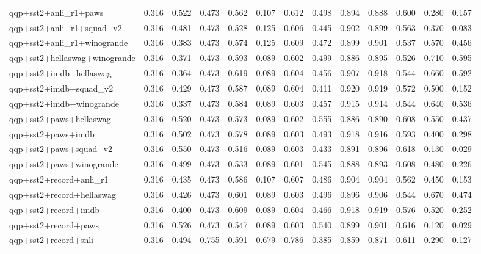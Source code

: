 \begin{table}[t]
\begin{tabular}{lrrrrrrrrrrrr}
    qqp+sst2+anli\_r1+paws & 0.316 & 0.522 & 0.473 & 0.562 & 0.107 & 0.612 & 0.498 & 0.894 & 0.888 & 0.600 & 0.280 & 0.157 \\
    qqp+sst2+anli\_r1+squad\_v2 & 0.316 & 0.481 & 0.473 & 0.528 & 0.125 & 0.606 & 0.445 & 0.902 & 0.899 & 0.563 & 0.370 & 0.083 \\
    qqp+sst2+anli\_r1+winogrande & 0.316 & 0.383 & 0.473 & 0.574 & 0.125 & 0.609 & 0.472 & 0.899 & 0.901 & 0.537 & 0.570 & 0.456 \\
    qqp+sst2+hellaswag+winogrande & 0.316 & 0.371 & 0.473 & 0.593 & 0.089 & 0.602 & 0.499 & 0.886 & 0.895 & 0.526 & 0.710 & 0.595 \\
    qqp+sst2+imdb+hellaswag & 0.316 & 0.364 & 0.473 & 0.619 & 0.089 & 0.604 & 0.456 & 0.907 & 0.918 & 0.544 & 0.660 & 0.592 \\
    qqp+sst2+imdb+squad\_v2 & 0.316 & 0.429 & 0.473 & 0.587 & 0.089 & 0.604 & 0.411 & 0.920 & 0.919 & 0.572 & 0.500 & 0.152 \\
    qqp+sst2+imdb+winogrande & 0.316 & 0.337 & 0.473 & 0.584 & 0.089 & 0.603 & 0.457 & 0.915 & 0.914 & 0.544 & 0.640 & 0.536 \\
    qqp+sst2+paws+hellaswag & 0.316 & 0.520 & 0.473 & 0.573 & 0.089 & 0.602 & 0.555 & 0.886 & 0.890 & 0.608 & 0.550 & 0.437 \\
    qqp+sst2+paws+imdb & 0.316 & 0.502 & 0.473 & 0.578 & 0.089 & 0.603 & 0.493 & 0.918 & 0.916 & 0.593 & 0.400 & 0.298 \\
    qqp+sst2+paws+squad\_v2 & 0.316 & 0.550 & 0.473 & 0.516 & 0.089 & 0.603 & 0.433 & 0.891 & 0.896 & 0.618 & 0.130 & 0.029 \\
    qqp+sst2+paws+winogrande & 0.316 & 0.499 & 0.473 & 0.533 & 0.089 & 0.601 & 0.545 & 0.888 & 0.893 & 0.608 & 0.480 & 0.226 \\
    qqp+sst2+record+anli\_r1 & 0.316 & 0.435 & 0.473 & 0.586 & 0.107 & 0.607 & 0.486 & 0.904 & 0.904 & 0.562 & 0.450 & 0.153 \\
    qqp+sst2+record+hellaswag & 0.316 & 0.426 & 0.473 & 0.601 & 0.089 & 0.603 & 0.496 & 0.896 & 0.906 & 0.544 & 0.670 & 0.474 \\
    qqp+sst2+record+imdb & 0.316 & 0.400 & 0.473 & 0.609 & 0.089 & 0.604 & 0.466 & 0.918 & 0.919 & 0.576 & 0.520 & 0.252 \\
    qqp+sst2+record+paws & 0.316 & 0.526 & 0.473 & 0.547 & 0.089 & 0.603 & 0.540 & 0.899 & 0.901 & 0.616 & 0.120 & 0.029 \\
    qqp+sst2+record+snli & 0.316 & 0.494 & 0.755 & 0.591 & 0.679 & 0.786 & 0.385 & 0.859 & 0.871 & 0.611 & 0.290 & 0.127 \\

\end{tabular}
\end{table}
